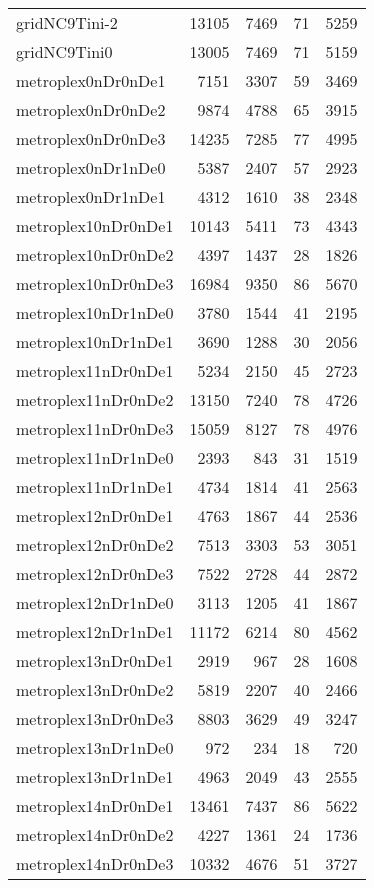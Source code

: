 \documentclass[../../../thesis.tex]{subfiles}
\begin{document}
\begin{longtable}{lrrrr}
gridNC9Tini-2 & 13105 & 7469 & 71 & 5259 \\
gridNC9Tini0 & 13005 & 7469 & 71 & 5159 \\
metroplex0nDr0nDe1 & 7151 & 3307 & 59 & 3469 \\
metroplex0nDr0nDe2 & 9874 & 4788 & 65 & 3915 \\
metroplex0nDr0nDe3 & 14235 & 7285 & 77 & 4995 \\
metroplex0nDr1nDe0 & 5387 & 2407 & 57 & 2923 \\
metroplex0nDr1nDe1 & 4312 & 1610 & 38 & 2348 \\
metroplex10nDr0nDe1 & 10143 & 5411 & 73 & 4343 \\
metroplex10nDr0nDe2 & 4397 & 1437 & 28 & 1826 \\
metroplex10nDr0nDe3 & 16984 & 9350 & 86 & 5670 \\
metroplex10nDr1nDe0 & 3780 & 1544 & 41 & 2195 \\
metroplex10nDr1nDe1 & 3690 & 1288 & 30 & 2056 \\
metroplex11nDr0nDe1 & 5234 & 2150 & 45 & 2723 \\
metroplex11nDr0nDe2 & 13150 & 7240 & 78 & 4726 \\
metroplex11nDr0nDe3 & 15059 & 8127 & 78 & 4976 \\
metroplex11nDr1nDe0 & 2393 & 843 & 31 & 1519 \\
metroplex11nDr1nDe1 & 4734 & 1814 & 41 & 2563 \\
metroplex12nDr0nDe1 & 4763 & 1867 & 44 & 2536 \\
metroplex12nDr0nDe2 & 7513 & 3303 & 53 & 3051 \\
metroplex12nDr0nDe3 & 7522 & 2728 & 44 & 2872 \\
metroplex12nDr1nDe0 & 3113 & 1205 & 41 & 1867 \\
metroplex12nDr1nDe1 & 11172 & 6214 & 80 & 4562 \\
metroplex13nDr0nDe1 & 2919 & 967 & 28 & 1608 \\
metroplex13nDr0nDe2 & 5819 & 2207 & 40 & 2466 \\
metroplex13nDr0nDe3 & 8803 & 3629 & 49 & 3247 \\
metroplex13nDr1nDe0 & 972 & 234 & 18 & 720 \\
metroplex13nDr1nDe1 & 4963 & 2049 & 43 & 2555 \\
metroplex14nDr0nDe1 & 13461 & 7437 & 86 & 5622 \\
metroplex14nDr0nDe2 & 4227 & 1361 & 24 & 1736 \\
metroplex14nDr0nDe3 & 10332 & 4676 & 51 & 3727 \\

\end{longtable}
\end{document}
